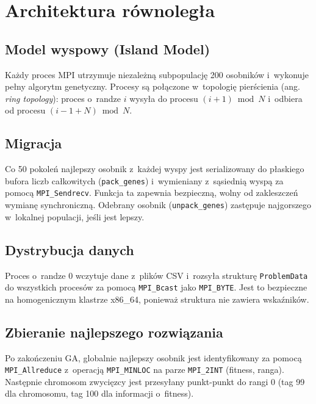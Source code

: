 \documentclass[12pt,a4paper]{article}
\begin{document}
\section{Architektura r\'{o}wnoleg\l{}a}

\subsection{Model wyspowy (Island Model)}

Ka\.{z}dy proces MPI utrzymuje niezale\.{z}n\k{a} subpopulacj\k{e} 200 osobnik\'{o}w i~wykonuje pe\l{}ny algorytm genetyczny. Procesy s\k{a} po\l{}\k{a}czone w~topologi\k{e} pier\'{s}cienia (ang. \textit{ring topology}): proces o~randze $i$ wysy\l{}a do procesu $(i+1) \bmod N$ i~odbiera od procesu $(i-1+N) \bmod N$.

\subsection{Migracja}

Co 50 pokole\'{n} najlepszy osobnik z~ka\.{z}dej wyspy jest serializowany do p\l{}askiego bufora liczb ca\l{}kowitych (\texttt{pack\_genes}) i~wymieniany z~s\k{a}siedni\k{a} wysp\k{a} za pomoc\k{a} \texttt{MPI\_Sendrecv}. Funkcja ta zapewnia bezpieczn\k{a}, wolny od zakleszcze\'{n} wymian\k{e} synchroniczn\k{a}. Odebrany osobnik (\texttt{unpack\_genes}) zast\k{e}puje najgorszego w~lokalnej populacji, je\'{s}li jest lepszy.

\subsection{Dystrybucja danych}

Proces o~randze 0 wczytuje dane z~plik\'{o}w CSV i~rozsy\l{}a struktur\k{e} \texttt{ProblemData} do wszystkich proces\'{o}w za pomoc\k{a} \texttt{MPI\_Bcast} jako \texttt{MPI\_BYTE}. Jest to bezpieczne na homogenicznym klastrze x86\_64, poniewa\.{z} struktura nie zawiera wska\'{z}nik\'{o}w.

\subsection{Zbieranie najlepszego rozwi\k{a}zania}

Po zako\'{n}czeniu GA, globalnie najlepszy osobnik jest identyfikowany za pomoc\k{a} \texttt{MPI\_Allreduce} z~operacj\k{a} \texttt{MPI\_MINLOC} na parze \texttt{MPI\_2INT} (fitness, ranga). Nast\k{e}pnie chromosom zwyci\k{e}zcy jest przesy\l{}any punkt-punkt do rangi 0 (tag 99 dla chromosomu, tag 100 dla informacji o~fitness).
\end{document}

